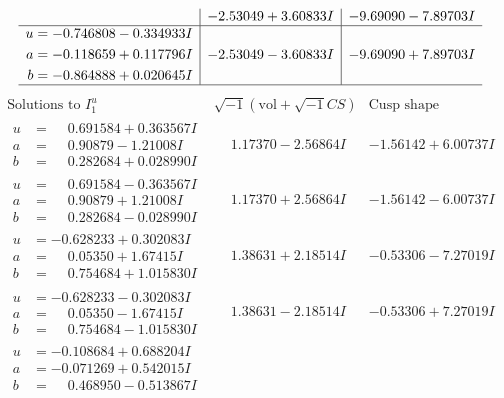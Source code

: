 \documentclass[1p]{elsarticle_modified}
\theoremstyle{definition}
\newcommand{\I}{\sqrt{-1}}
\begin{document}
$$\begin{array}{c|c|c}
 & -2.53049 + 3.60833 I & -9.69090 - 7.89703 I \\ \hline\begin{aligned}
u &= -0.746808 - 0.334933 I \\
a &= -0.118659 + 0.117796 I \\
b &= -0.864888 + 0.020645 I\end{aligned}
 & -2.53049 - 3.60833 I & -9.69090 + 7.89703 I\\
 \hline 
 \end{array}$$\newpage$$\begin{array}{c|c|c}  
\text{Solutions to }I^u_{1}& \I (\text{vol} + \sqrt{-1}CS) & \text{Cusp shape}\\
 \hline 
\begin{aligned}
u &= \phantom{-}0.691584 + 0.363567 I \\
a &= \phantom{-}0.90879 - 1.21008 I \\
b &= \phantom{-}0.282684 + 0.028990 I\end{aligned}
 & \phantom{-}1.17370 - 2.56864 I & -1.56142 + 6.00737 I \\ \hline\begin{aligned}
u &= \phantom{-}0.691584 - 0.363567 I \\
a &= \phantom{-}0.90879 + 1.21008 I \\
b &= \phantom{-}0.282684 - 0.028990 I\end{aligned}
 & \phantom{-}1.17370 + 2.56864 I & -1.56142 - 6.00737 I \\ \hline\begin{aligned}
u &= -0.628233 + 0.302083 I \\
a &= \phantom{-}0.05350 + 1.67415 I \\
b &= \phantom{-}0.754684 + 1.015830 I\end{aligned}
 & \phantom{-}1.38631 + 2.18514 I & -0.53306 - 7.27019 I \\ \hline\begin{aligned}
u &= -0.628233 - 0.302083 I \\
a &= \phantom{-}0.05350 - 1.67415 I \\
b &= \phantom{-}0.754684 - 1.015830 I\end{aligned}
 & \phantom{-}1.38631 - 2.18514 I & -0.53306 + 7.27019 I \\ \hline\begin{aligned}
u &= -0.108684 + 0.688204 I \\
a &= -0.071269 + 0.542015 I \\
b &= \phantom{-}0.468950 - 0.513867 I\end{aligned}

\end{array}$$
\end{document}
